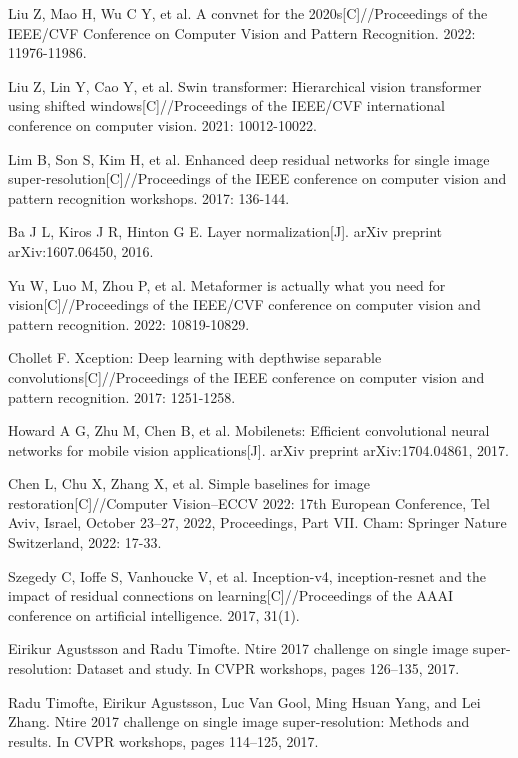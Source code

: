 \documentclass[10pt,twocolumn,letterpaper]{article}
\begin{document}
{\small
\begin{thebibliography}{100} 
	
	 Liu Z, Mao H, Wu C Y, et al. A convnet for the 2020s[C]//Proceedings of the IEEE/CVF Conference on Computer Vision and Pattern Recognition. 2022: 11976-11986.
	
	Liu Z, Lin Y, Cao Y, et al. Swin transformer: Hierarchical vision transformer using shifted windows[C]//Proceedings of the IEEE/CVF international conference on computer vision. 2021: 10012-10022.
	
	 Lim B, Son S, Kim H, et al. Enhanced deep residual networks for single image super-resolution[C]//Proceedings of the IEEE conference on computer vision and pattern recognition workshops. 2017: 136-144.
 
    Ba J L, Kiros J R, Hinton G E. Layer normalization[J]. arXiv preprint arXiv:1607.06450, 2016.

    Yu W, Luo M, Zhou P, et al. Metaformer is actually what you need for vision[C]//Proceedings of the IEEE/CVF conference on computer vision and pattern recognition. 2022: 10819-10829.

    Chollet F. Xception: Deep learning with depthwise separable convolutions[C]//Proceedings of the IEEE conference on computer vision and pattern recognition. 2017: 1251-1258.
    
     Howard A G, Zhu M, Chen B, et al. Mobilenets: Efficient convolutional neural networks for mobile vision applications[J]. arXiv preprint arXiv:1704.04861, 2017.
    
     Chen L, Chu X, Zhang X, et al. Simple baselines for image restoration[C]//Computer Vision–ECCV 2022: 17th European Conference, Tel Aviv, Israel, October 23–27, 2022, Proceedings, Part VII. Cham: Springer Nature Switzerland, 2022: 17-33.
     
     Szegedy C, Ioffe S, Vanhoucke V, et al. Inception-v4, inception-resnet and the impact of residual connections on learning[C]//Proceedings of the AAAI conference on artificial intelligence. 2017, 31(1).
     
     Eirikur Agustsson and Radu Timofte. Ntire 2017 challenge on single image super-resolution: Dataset and study. In CVPR workshops, pages 126–135, 2017.
     
     Radu Timofte, Eirikur Agustsson, Luc Van Gool, Ming Hsuan Yang, and Lei Zhang. Ntire 2017 challenge on single image super-resolution: Methods and results. In CVPR workshops, pages 114–125, 2017.
	
	
	
\end{thebibliography}
}
\end{document}
